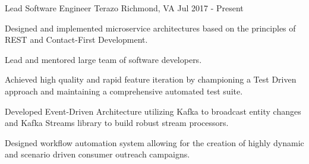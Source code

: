 
\begin{cventries}

  \cventry
  {Lead Software Engineer} %
  {Terazo} %
  {Richmond, VA} %
  {Jul 2017 - Present} %
  {
    \begin{cvitems} %
      \item {Designed and implemented microservice architectures based on the
      principles of REST and Contact-First Development.}
      \item {Lead and mentored large team of software developers.}
      \item {Achieved high quality and rapid feature iteration by championing a
      Test Driven approach and maintaining a comprehensive automated test
      suite.}
      \item {Developed Event-Driven Architecture utilizing Kafka to broadcast
      entity changes and Kafka Streams library to build robust stream
      processors.}
      \item {Designed workflow automation system allowing for the creation of
      highly dynamic and scenario driven consumer outreach campaigns.}
    \end{cvitems}
  }


\end{cventries}
